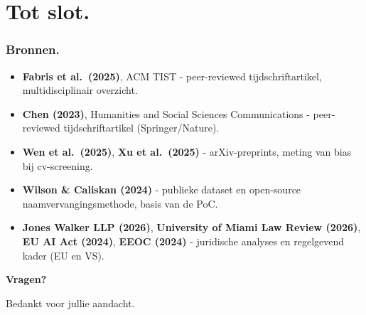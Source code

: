 \documentclass[aspectratio=169]{beamer}
\begin{document}

\section{Tot slot.}

\begin{frame}
    \frametitle{Bronnen.}

    \small
     \begin{itemize}
        \item \textbf{Fabris et al.\ (2025)}, ACM TIST - peer-reviewed
            tijdschriftartikel, multidisciplinair overzicht.
        \item \textbf{Chen (2023)}, Humanities and Social Sciences
            Communications - peer-reviewed tijdschriftartikel
            (Springer/Nature).
        \item \textbf{Wen et al.\ (2025)}, \textbf{Xu et al.\ (2025)} -
            arXiv-preprints, meting van bias bij cv-screening.
        \item \textbf{Wilson \& Caliskan (2024)} - publieke dataset en
            open-source naamvervangingsmethode, basis van de PoC.
        \item \textbf{Jones Walker LLP (2026)}, \textbf{University of
            Miami Law Review (2026)}, \textbf{EU AI Act (2024)},
            \textbf{EEOC (2024)} - juridische analyses en regelgevend
            kader (EU en VS).
    \end{itemize}


\end{frame}

\begin{frame}
    {\Huge \textbf{Vragen?}}

    \bigskip
    Bedankt voor jullie aandacht.
\end{frame}
\end{document}
